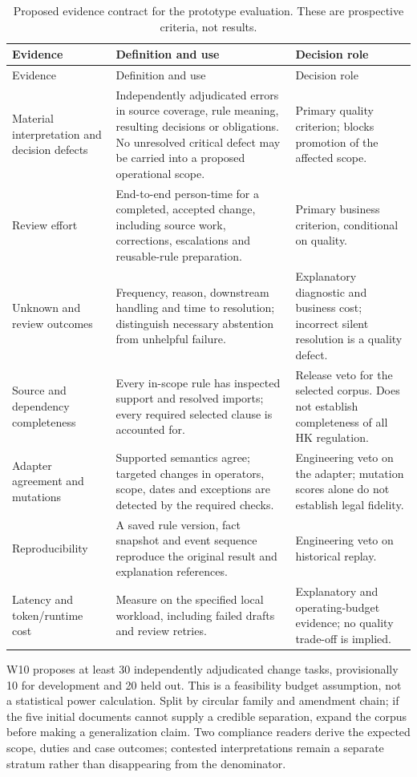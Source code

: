 \documentclass[12pt,a4paper,oneside,openany]{book}
\begin{document}
\begingroup\small
\begin{longtable}{P{0.25\textwidth}P{0.39\textwidth}P{0.26\textwidth}}
\caption{Proposed evidence contract for the prototype evaluation. These are
prospective criteria, not results.}\label{tab:evaluation}\\
\toprule Evidence & Definition and use & Decision role \\\midrule
\endfirsthead
\toprule Evidence & Definition and use & Decision role \\\midrule
\endhead
Material interpretation and decision defects & Independently adjudicated errors
in source coverage, rule meaning, resulting decisions or obligations. No unresolved
critical defect may be carried into a proposed operational scope. & Primary quality
criterion; blocks promotion of the affected scope.\\
Review effort & End-to-end person-time for a completed, accepted change, including
source work, corrections, escalations and reusable-rule preparation. & Primary
business criterion, conditional on quality.\\
Unknown and review outcomes & Frequency, reason, downstream handling and time to
resolution; distinguish necessary abstention from unhelpful failure. & Explanatory
diagnostic and business cost; incorrect silent resolution is a quality defect.\\
Source and dependency completeness & Every in-scope rule has inspected support and
resolved imports; every required selected clause is accounted for. & Release veto
for the selected corpus. Does not establish completeness of all HK regulation.\\
Adapter agreement and mutations & Supported semantics agree; targeted changes in
operators, scope, dates and exceptions are detected by the required checks. &
Engineering veto on the adapter; mutation scores alone do not establish legal fidelity.\\
Reproducibility & A saved rule version, fact snapshot and event sequence reproduce
the original result and explanation references. & Engineering veto on historical replay.\\
Latency and token/runtime cost & Measure on the specified local workload, including
failed drafts and review retries. & Explanatory and operating-budget evidence; no
quality trade-off is implied.\\
\bottomrule
\end{longtable}
\endgroup

W10 proposes at least 30 independently adjudicated change tasks, provisionally
10 for development and 20 held out. This is a feasibility budget assumption,
not a statistical power calculation. Split by circular family and amendment
chain; if the five initial documents cannot supply a credible separation, expand
the corpus before making a generalization claim. Two compliance readers derive
the expected scope, duties and case outcomes; contested interpretations remain
a separate stratum rather than disappearing from the denominator.
\end{document}
